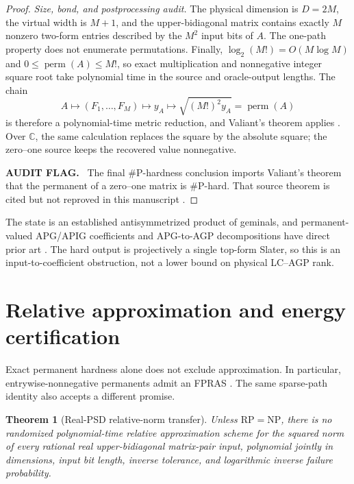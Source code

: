 \documentclass[aps,pra,reprint,superscriptaddress,nofootinbib,longbibliography,showkeys]{revtex4-2}
\newtheorem{theorem}{Theorem}[section]
\theoremstyle{definition}
\newenvironment{auditflag}
  {\par\smallskip\noindent\textbf{AUDIT FLAG.}\ }
  {\par\smallskip}
\newcommand{\perm}{\operatorname{perm}}
\begin{document}
\begin{proof}
\medskip\noindent\textit{Size, bond, and postprocessing audit.}\quad
The physical dimension is $D=2M$, the virtual width is $M+1$, and the
upper-bidiagonal matrix contains exactly $M$ nonzero two-form entries described
by the $M^2$ input bits of $A$.  The one-path property does not enumerate
permutations.  Finally, $\log_2(M!)=O(M\log M)$ and
$0\le\perm(A)\le M!$, so exact multiplication and nonnegative integer square
root take polynomial time in the source and oracle-output lengths.  The chain
\begin{equation}
A\longmapsto(F_1,\ldots,F_M)\longmapsto y_A
\longmapsto\sqrt{(M!)^2y_A}=\perm(A)
\end{equation}
is therefore a polynomial-time metric reduction, and Valiant's theorem applies
\cite{Valiant1979Permanent}.  Over $\mathbb C$, the same calculation replaces
the square by the absolute square; the zero--one source keeps the recovered
value nonnegative.

\begin{auditflag}
The final \#P-hardness conclusion imports Valiant's theorem that the permanent
of a zero--one matrix is \#P-hard.  That source theorem is cited but not
reproved in this manuscript \cite{Valiant1979Permanent}.
\end{auditflag}
\end{proof}

The state is an established antisymmetrized product of geminals, and permanent-
valued APG/APIG coefficients and APG-to-AGP decompositions have direct prior
art \cite{KawasakiNakatani2024LowRankAPG,
RicherKimAyers2025GraphicalGeminals}.  The hard output is projectively a single
top-form Slater, so this is an input-to-coefficient obstruction, not a lower
bound on physical LC--AGP rank.

\section{Relative approximation and energy certification}

Exact permanent hardness alone does not exclude approximation.  In particular,
entrywise-nonnegative permanents admit an FPRAS
\cite{JerrumSinclairVigoda2004PermanentFPRAS}.  The same sparse-path identity also
accepts a different promise.

\begin{theorem}[Real-PSD relative-norm transfer]
Unless $\mathrm{RP}=\mathrm{NP}$, there is no randomized polynomial-time
relative approximation scheme for the squared norm of every rational real
upper-bidiagonal matrix-pair input, polynomial jointly in dimensions, input
bit length, inverse tolerance, and logarithmic inverse failure probability.
\end{theorem}
\end{document}
